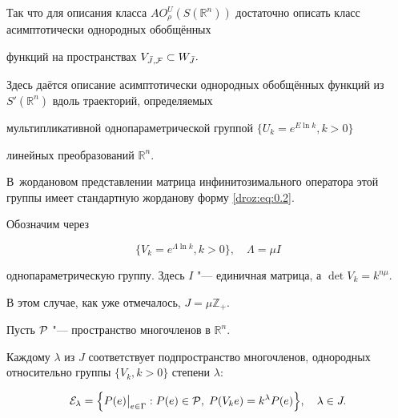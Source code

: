 Так что для описания класса $AO_{\rho}^{U}(S(\mathbb R^n))$ достаточно описать класс асимптотически однородных обобщённых

функций на пространствах $V_{\bar{J},{\cal F}} \subset W_{\bar{J}}.$



\hypertarget{droz:p2}{}



\smallskip





Здесь  даётся описание асимптотически однородных обобщённых функций из $S'(\mathbb R^n)$ вдоль траекторий, определяемых

мультипликативной однопараметрической группой $\{U_k=e^{E\ln k}, k>0\}$

линейных преобразований $\mathbb R^n.$ 

В~жордановом представлении матрица инфинитозимального оператора этой группы имеет стандартную жорданову форму \eqref{droz:eq:0.2}. 

Обозначим через 

\begin{equation*}


\{V_k=e^{\Lambda \ln k},k>0\},\quad \Lambda =\mu I

\end{equation*}

однопараметрическую группу. Здесь $I$ "--- единичная матрица,  а $\det V_k=k^{n\mu}$. 

В этом случае, как уже отмечалось, $J=\mu \mathbb Z_{+}.$



Пусть $\cal P$ "--- пространство многочленов в $\mathbb R^n.$ 

Каждому $\lambda$ из $J$ соответствует подпространство многочленов, однородных относительно группы $\{V_k, k>0\}$ степени $\lambda$:

\begin{equation}

\label{droz:eq:2.2}

{\cal E}_{\lambda}=\Bigl\{  P(e)\big|_{e\in \Gamma} : P(e)\in {\cal P},\; P(V_ke)=k^{\lambda}P(e)\Bigr\}, \quad \lambda \in J.

\end{equation}

